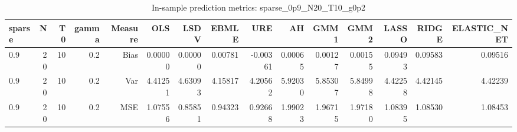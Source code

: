 \begin{table}[!htbp]\centering
\caption{In-sample prediction metrics: sparse_0p9_N20_T10_g0p2}
\label{tab:table2_sparse_0p9_N20_T10_g0p2}
\begin{tabular}{lrrrrrrrrrrrrrr}
\hline
sparse & N & T0 & gamma & Measure & OLS & LSDV & EBMLE & URE & AH & GMM1 & GMM2 & LASSO & RIDGE & ELASTIC_NET \\
\hline
0.9 & 20 & 10 & 0.2 & Bias & 0.00000 & 0.00000 & 0.00781 & -0.00361 & 0.00065 & 0.00127 & 0.00155 & 0.09493 & 0.09583 & 0.09516 \\
0.9 & 20 & 10 & 0.2 & Var & 4.41251 & 4.63093 & 4.15817 & 4.20562 & 5.92030 & 5.85307 & 5.84998 & 4.42258 & 4.42145 & 4.42239 \\
0.9 & 20 & 10 & 0.2 & MSE & 1.07556 & 0.85851 & 0.94323 & 0.92668 & 1.99023 & 1.96715 & 1.97180 & 1.08395 & 1.08530 & 1.08453 \\
\hline
\end{tabular}
\end{table}

